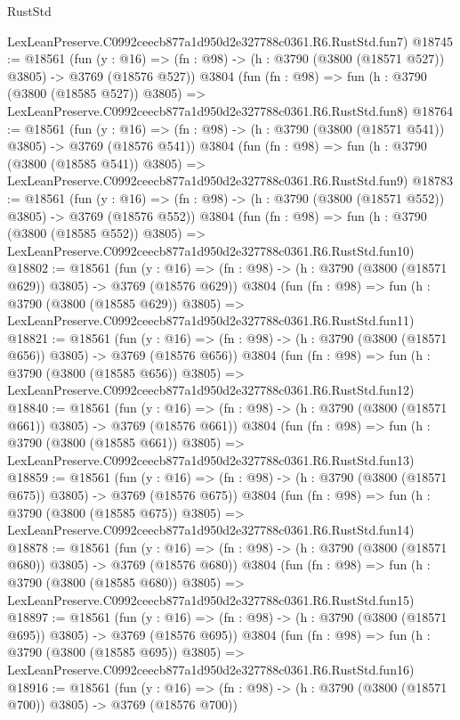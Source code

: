 \begin{lexlean}{RustStd}
\begin{coremodule}
    LexLeanPreserve.C0992ceecb877a1d950d2e327788c0361.R6.RustStd.fun7)
@18745 := @18561
    (fun (y : @16) => (fn : @98) -> (h : @3790 (@3800 (@18571 @527)) @3805) -> @3769 (@18576 @527))
    @3804
    (fun (fn : @98) =>
    fun (h : @3790 (@3800 (@18585 @527)) @3805) =>
    LexLeanPreserve.C0992ceecb877a1d950d2e327788c0361.R6.RustStd.fun8)
@18764 := @18561
    (fun (y : @16) => (fn : @98) -> (h : @3790 (@3800 (@18571 @541)) @3805) -> @3769 (@18576 @541))
    @3804
    (fun (fn : @98) =>
    fun (h : @3790 (@3800 (@18585 @541)) @3805) =>
    LexLeanPreserve.C0992ceecb877a1d950d2e327788c0361.R6.RustStd.fun9)
@18783 := @18561
    (fun (y : @16) => (fn : @98) -> (h : @3790 (@3800 (@18571 @552)) @3805) -> @3769 (@18576 @552))
    @3804
    (fun (fn : @98) =>
    fun (h : @3790 (@3800 (@18585 @552)) @3805) =>
    LexLeanPreserve.C0992ceecb877a1d950d2e327788c0361.R6.RustStd.fun10)
@18802 := @18561
    (fun (y : @16) => (fn : @98) -> (h : @3790 (@3800 (@18571 @629)) @3805) -> @3769 (@18576 @629))
    @3804
    (fun (fn : @98) =>
    fun (h : @3790 (@3800 (@18585 @629)) @3805) =>
    LexLeanPreserve.C0992ceecb877a1d950d2e327788c0361.R6.RustStd.fun11)
@18821 := @18561
    (fun (y : @16) => (fn : @98) -> (h : @3790 (@3800 (@18571 @656)) @3805) -> @3769 (@18576 @656))
    @3804
    (fun (fn : @98) =>
    fun (h : @3790 (@3800 (@18585 @656)) @3805) =>
    LexLeanPreserve.C0992ceecb877a1d950d2e327788c0361.R6.RustStd.fun12)
@18840 := @18561
    (fun (y : @16) => (fn : @98) -> (h : @3790 (@3800 (@18571 @661)) @3805) -> @3769 (@18576 @661))
    @3804
    (fun (fn : @98) =>
    fun (h : @3790 (@3800 (@18585 @661)) @3805) =>
    LexLeanPreserve.C0992ceecb877a1d950d2e327788c0361.R6.RustStd.fun13)
@18859 := @18561
    (fun (y : @16) => (fn : @98) -> (h : @3790 (@3800 (@18571 @675)) @3805) -> @3769 (@18576 @675))
    @3804
    (fun (fn : @98) =>
    fun (h : @3790 (@3800 (@18585 @675)) @3805) =>
    LexLeanPreserve.C0992ceecb877a1d950d2e327788c0361.R6.RustStd.fun14)
@18878 := @18561
    (fun (y : @16) => (fn : @98) -> (h : @3790 (@3800 (@18571 @680)) @3805) -> @3769 (@18576 @680))
    @3804
    (fun (fn : @98) =>
    fun (h : @3790 (@3800 (@18585 @680)) @3805) =>
    LexLeanPreserve.C0992ceecb877a1d950d2e327788c0361.R6.RustStd.fun15)
@18897 := @18561
    (fun (y : @16) => (fn : @98) -> (h : @3790 (@3800 (@18571 @695)) @3805) -> @3769 (@18576 @695))
    @3804
    (fun (fn : @98) =>
    fun (h : @3790 (@3800 (@18585 @695)) @3805) =>
    LexLeanPreserve.C0992ceecb877a1d950d2e327788c0361.R6.RustStd.fun16)
@18916 := @18561
    (fun (y : @16) => (fn : @98) -> (h : @3790 (@3800 (@18571 @700)) @3805) -> @3769 (@18576 @700))

\end{coremodule}
\end{lexlean}
